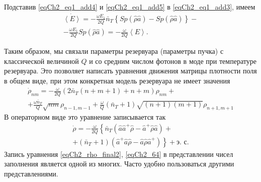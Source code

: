 Подставив \eqref{eqCh2_eq1_add4} и \eqref{eqCh2_eq1_add5} в 
\eqref{eqCh2_eq1_add3}, имеем
\begin{eqnarray}
\dot{\left<E\right>} =
- \frac{\omega E_1}{2Q}\bar{n}_T
\left\{Sp\left(\hat{\rho}\hat{a}\right) -
Sp\left(\hat{\rho}\hat{a}\right)\right\} -
\nonumber \\
- \frac{\omega E_1}{2Q}Sp\left(\hat{\rho}\hat{a}\right) = 
- \frac{\omega}{2Q}\left<E\right>.
\label{eqCh2_61}
\end{eqnarray}

Таким образом, мы связали параметры резервуара (параметры
пучка) с классической величиной $Q$ и со средним числом фотонов в моде 
при температуре резервуара. Это позволяет написать уравнения движения
матрицы плотности поля в общем виде, при этом конкретная модель
резервуара не имеет значения 
\begin{eqnarray}
\dot{\rho}_{nm} = - \frac{\omega}{2 Q}
\left(2 \bar{n}_T\left( n + m + 1\right) + n + m \right)\rho_{nm} +
\nonumber \\
+ \frac{\omega \bar{n}_T}{Q}\sqrt{nm}\rho_{n - 1, m - 1} +
\frac{\omega}{Q}\left(\bar{n}_T + 1\right)
\sqrt{\left(n + 1\right)\left(m + 1\right)}
\rho_{n + 1, m + 1}
\label{eqCh2_63}
\end{eqnarray}
В операторном виде это уравнение записывается так
\begin{eqnarray}
\dot{\rho} = - \frac{\omega}{2 Q}
\left\{
\bar{n}_T\left(\hat{a}\hat{a}^{+}\hat{\rho} - 
\hat{a}^{+}\hat{\rho}\hat{a}\right)
\right. +
\nonumber \\
+
\left .
\left(\bar{n}_T + 1\right)\left(\hat{a}^{+}\hat{a}\hat{\rho} - 
\hat{a}\hat{\rho}\hat{a}^{+}\right)
\right\} + \mbox{э. с.}
\label{eqCh2_64}
\end{eqnarray}
Запись уравнения \eqref{eqCh2_rho_final2}, \ref{eqCh2_64} в
представлении чисел заполнения является одной из многих. Часто удобно
пользоваться другими представлениями.  
